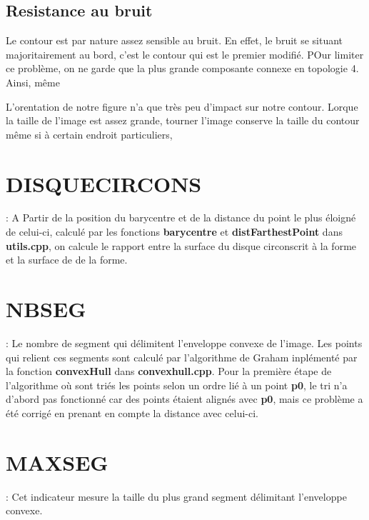 \documentclass{report}
\begin{document}
\subsection{Resistance au bruit}
Le contour est par nature assez sensible au bruit. 
En effet, le bruit se situant majoritairement au bord, c'est le contour qui est le premier modifié.
POur limiter ce problème, on ne garde que la plus grande composante connexe en topologie 4. Ainsi, même


L'orentation de notre figure n'a que très peu d'impact sur notre contour. 
Lorque la taille de l'image est assez grande, tourner l'image conserve la taille du contour même si à certain endroit particuliers,

\section{DISQUECIRCONS} : A Partir de la position du barycentre et de la distance du point le plus éloigné de celui-ci, calculé par les fonctions \textbf{barycentre} et \textbf{distFarthestPoint} dans \textbf{utils.cpp}, on calcule le rapport entre la surface du disque circonscrit à la forme et la surface de de la forme.
\section{NBSEG} : Le nombre de segment qui délimitent l'enveloppe convexe de l'image. Les points qui relient ces segments sont calculé par l'algorithme de Graham inplémenté par la fonction \textbf{convexHull} dans \textbf{convexhull.cpp}. Pour la première étape de l'algorithme où sont triés les points selon un ordre lié à un point \textbf{p0}, le tri n'a d'abord pas fonctionné car des points étaient alignés avec \textbf{p0}, mais ce problème a été corrigé en prenant en compte la distance avec celui-ci.
\section{MAXSEG} : Cet indicateur mesure la taille du plus grand segment délimitant l'enveloppe convexe.
\end{document}
